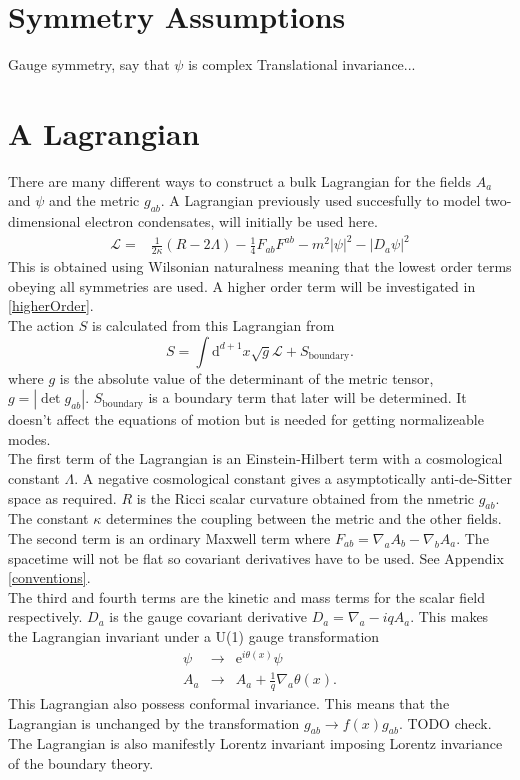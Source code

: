 \documentclass[12pt]{report}
\renewcommand{\d}{\ensuremath{\mathrm{d}}}
\renewcommand{\L}{\ensuremath{\mathcal{L}}}
\begin{document}
\section{Symmetry Assumptions}
Gauge symmetry, say that $\psi$ is complex
Translational invariance...
\section{A Lagrangian}
There are many different ways to construct a bulk Lagrangian for the fields $A_a$ and  $\psi$ and the metric $g_{ab}$. A Lagrangian previously used succesfully to model two-dimensional electron condensates\cite{hartnoll9},\cite{horowitz} will initially be used here.
\begin{eqnarray}
 \mathcal{L}=&\frac{1}{2\kappa}\left(R-2\Lambda\right)-\frac{1}{4}F_{ab}F^{ab}-m^2|\psi|^2-|D_a\psi|^2
\label{L}
\end{eqnarray}
This is obtained using Wilsonian naturalness meaning that the lowest order terms obeying all symmetries are used. A higher order term will be investigated in \ref{higherOrder}.\\

The action $S$ is calculated from this Lagrangian from
\begin{equation}
 S=\int\d^{d+1} x\sqrt{g}\L+S_\mathrm{boundary}.
\end{equation}
where $g$ is the absolute value of the determinant of the metric tensor, $g=|\det g_{ab}|$. $S_\mathrm{boundary}$ is a boundary term that later will be determined. It doesn't affect the equations of motion but is needed for getting normalizeable modes.\\

The first term of the Lagrangian is an Einstein-Hilbert term with a cosmological constant $\Lambda$. A negative cosmological constant gives a asymptotically anti-de-Sitter space as required. $R$ is the Ricci scalar curvature obtained from the nmetric $g_{ab}$. The constant $\kappa$ determines the coupling between the metric and the other fields.\\

The second term is an ordinary Maxwell term where $F_{ab}=\nabla_aA_b-\nabla_bA_a$. The spacetime will not be flat so covariant derivatives have to be used. See Appendix \ref{conventions}.\\

The third and fourth terms are the kinetic and mass terms for the scalar field respectively. $D_a$ is the gauge covariant derivative $D_a=\nabla_a-iqA_a$. This makes the Lagrangian invariant under a U(1) gauge transformation
\begin{eqnarray}
 \psi&\rightarrow&\mathrm{e}^{i\theta(x)}\psi\\
 A_a&\rightarrow& A_a+\frac{1}{q}\nabla_a\theta(x)\label{Agauge}.
\end{eqnarray}
This Lagrangian also possess conformal invariance. This means that the Lagrangian is unchanged by the transformation $g_{ab}\rightarrow f(x)g_{ab}$. TODO check.
The Lagrangian is also manifestly Lorentz invariant imposing Lorentz invariance of the boundary theory. 
\end{document}
